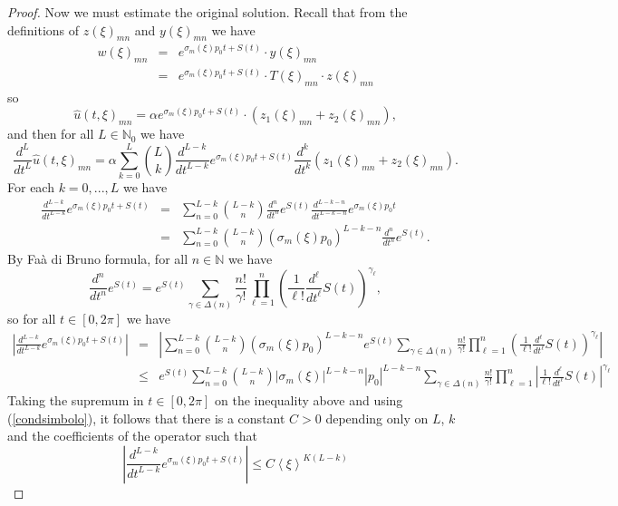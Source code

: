 \documentclass[sn-mathphys-num]{sn-jnl}%
\numberwithin{equation}{section}
\theoremstyle{thmstyleone}
\theoremstyle{thmstyletwo}
\theoremstyle{thmstylethree}
\def\jp#1{{\left\langle{#1}\right\rangle}}
\begin{document}
\begin{proof}
 Now we must estimate the original solution. Recall that from the definitions of $z(\xi)_{mn}$ and $y(\xi)_{mn}$ we have
 \begin{eqnarray*} w(\xi)_{mn} & = & e^{\sigma_m(\xi)p_0 t+S(t)}\cdot y(\xi)_{mn}\\
   & = & e^{\sigma_m(\xi)p_0 t +S(t)} \cdot T(\xi)_{mn} \cdot z(\xi)_{mn}
 \end{eqnarray*} 
 so
 \begin{equation}\label{solutionu}
 	\widehat{u}(t,\xi)_{mn}  = \alpha e^{\sigma_m(\xi)p_0 t +S(t)}\cdot (z_1(\xi)_{mn}+z_2(\xi)_{mn}),
 \end{equation} 
 and then for all $L \in \mathbb{N}_0$ we have
 $$\frac{d^L}{dt^L} \widehat{u}(t,\xi)_{mn} = \alpha \sum_{k=0}^L \binom{L}{k} \frac{d^{L-k}}{dt^{L-k}} e^{\sigma_m(\xi) p_0 t +S(t)} \frac{d^k}{dt^k}(z_1(\xi)_{mn}+z_2(\xi)_{mn}).$$  
 For each $k=0,...,L$ we have
 \begin{eqnarray*} \frac{d^{L-k}}{dt^{L-k}} e^{\sigma_m(\xi) p_0 t +S(t)} & = & \sum_{n=0}^{L-k} \binom{L-k}{n} \frac{d^n}{dt^n} e^{S(t)} \frac{d^{L-k-n}}{dt^{L-k-n}} e^{\sigma_m(\xi) p_0 t} \\
 	& = & \sum_{n=0}^{L-k} \binom{L-k}{n} (\sigma_m(\xi) p_0)^{L-k-n} \frac{d^n}{dt^n} e^{S(t)}.
 \end{eqnarray*} 
 By Faà di Bruno formula, for all $n \in \mathbb{N}$ we have
 $$\frac{d^n}{dt^n} e^{S(t)} = e^{S(t)} \sum_{\gamma \in \Delta(n)} \frac{n!}{\gamma!} \prod_{\ell=1}^n \left( \frac{1}{\ell!} \frac{d^\ell}{dt^\ell} S(t)\right)^{\gamma_\ell},$$
 so for all $t \in [0,2\pi]$ we have
 \begin{eqnarray*}
 	\left| \frac{d^{L-k}}{dt^{L-k}} e^{\sigma_m(\xi)p_0 t+S(t)} \right| & = & \left| \sum_{n=0}^{L-k} \binom{L-k}{n} (\sigma_m(\xi) p_0)^{L-k-n} e^{S(t)} \sum_{\gamma \in \Delta(n)} \frac{n!}{\gamma!} \prod_{\ell=1}^n \left( \frac{1}{\ell!} \frac{d^\ell}{dt^\ell} S(t)\right)^{\gamma_\ell} \right|  \\ 
	& \leq & e^{S(t)} \sum_{n=0}^{L-k} \binom{L-k}{n} |\sigma_m(\xi)|^{L-k-n} |p_0|^{L-k-n} \sum_{\gamma \in \Delta(n)} \frac{n!}{\gamma!} \prod_{\ell=1}^n \left| \frac{1}{\ell!} \frac{d^\ell}{dt^\ell} S(t)\right|^{\gamma_\ell}
 \end{eqnarray*}
 Taking the supremum in $t \in [0,2\pi]$ on the inequality above and using (\ref{condsimbolo}), it follows that there is a constant $C>0$ depending only on $L$, $k$ and the coefficients of the operator such that
 \begin{equation}\label{exp_simbolo}
 \left| \frac{d^{L-k}}{dt^{L-k}} e^{\sigma_m(\xi)p_0 t+S(t)} \right| \leq C\jp{\xi}^{K(L-k)}
 \end{equation} 
 

\end{proof}
\end{document}
